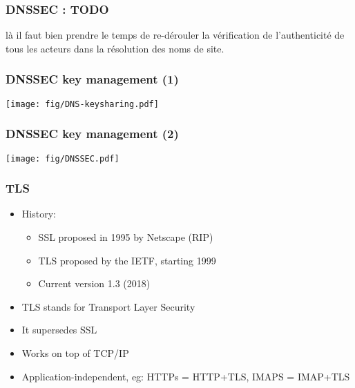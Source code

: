 \documentclass[
hyperref={pdfpagelabels=false}
,xcolor=table
]
{beamer}
\begin{document}
\begin{frame}
  \frametitle{DNSSEC : TODO}

  là il faut bien prendre le temps de re-dérouler la vérification de
  l'authenticité de tous les acteurs dans la résolution des noms de
  site.

  
\end{frame}


\begin{frame}
  \frametitle{DNSSEC key management (1)}

  \begin{center}
    \texttt{[image: fig/DNS-keysharing.pdf]}
  \end{center}
   
\end{frame}



\begin{frame}
  \frametitle{DNSSEC key management (2)}


  \begin{center}
    \texttt{[image: fig/DNSSEC.pdf]}
  \end{center}
   
\end{frame}


\begin{frame}
  \frametitle{TLS}
  \begin{itemize}
  \item History:
    \begin{itemize}
    \item SSL proposed in 1995 by Netscape (RIP)
    \item TLS proposed by the IETF, starting 1999
    \item Current version 1.3 (2018)
    \end{itemize}
  \item TLS stands for Transport Layer Security
  \item It supersedes SSL 
  \item Works on top of TCP/IP
  \item Application-independent, eg: HTTPs = HTTP+TLS, IMAPS = IMAP+TLS
  \end{itemize}
\end{frame}
\end{document}

